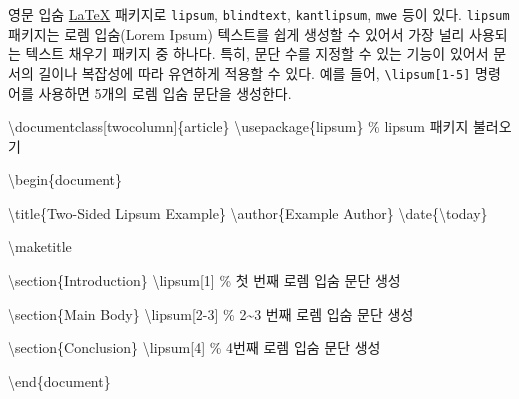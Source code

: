 \documentclass[
  letterpaper,
]{book}
\newenvironment{Shaded}{\begin{snugshade}}{\end{snugshade}}
\newcommand{\BuiltInTok}[1]{\textcolor[rgb]{0.00,0.23,0.31}{#1}}
\newcommand{\CommentTok}[1]{\textcolor[rgb]{0.37,0.37,0.37}{#1}}
\newcommand{\ExtensionTok}[1]{\textcolor[rgb]{0.00,0.23,0.31}{#1}}
\newcommand{\FunctionTok}[1]{\textcolor[rgb]{0.28,0.35,0.67}{#1}}
\newcommand{\KeywordTok}[1]{\textcolor[rgb]{0.00,0.23,0.31}{#1}}
\newcommand{\NormalTok}[1]{\textcolor[rgb]{0.00,0.23,0.31}{#1}}
\begin{document}
영문 입숨 \href{http://example.org}{\LaTeX} 패키지로 \texttt{lipsum},
\texttt{blindtext}, \texttt{kantlipsum}, \texttt{mwe} 등이 있다.
\texttt{lipsum} 패키지는 로렘 입숨(Lorem Ipsum) 텍스트를 쉽게 생성할 수
있어서 가장 널리 사용되는 텍스트 채우기 패키지 중 하나다. 특히, 문단
수를 지정할 수 있는 기능이 있어서 문서의 길이나 복잡성에 따라 유연하게
적용할 수 있다. 예를 들어, \texttt{\textbackslash{}lipsum{[}1-5{]}}
명령어를 사용하면 5개의 로렘 입숨 문단을 생성한다.

\begin{Shaded}
\begin{Highlighting}[]
\BuiltInTok{\textbackslash{}documentclass}\NormalTok{[twocolumn]\{}\ExtensionTok{article}\NormalTok{\}}
\BuiltInTok{\textbackslash{}usepackage}\NormalTok{\{}\ExtensionTok{lipsum}\NormalTok{\} }\CommentTok{\% lipsum 패키지 불러오기}

\KeywordTok{\textbackslash{}begin}\NormalTok{\{}\ExtensionTok{document}\NormalTok{\}}

\FunctionTok{\textbackslash{}title}\NormalTok{\{Two{-}Sided Lipsum Example\}}
\FunctionTok{\textbackslash{}author}\NormalTok{\{Example Author\}}
\FunctionTok{\textbackslash{}date}\NormalTok{\{}\FunctionTok{\textbackslash{}today}\NormalTok{\}}

\FunctionTok{\textbackslash{}maketitle}

\KeywordTok{\textbackslash{}section}\NormalTok{\{Introduction\}}
\FunctionTok{\textbackslash{}lipsum}\NormalTok{[1] }\CommentTok{\% 첫 번째 로렘 입숨 문단 생성}

\KeywordTok{\textbackslash{}section}\NormalTok{\{Main Body\}}
\FunctionTok{\textbackslash{}lipsum}\NormalTok{[2{-}3] }\CommentTok{\% 2\textasciitilde{}3 번째 로렘 입숨 문단 생성}

\KeywordTok{\textbackslash{}section}\NormalTok{\{Conclusion\}}
\FunctionTok{\textbackslash{}lipsum}\NormalTok{[4] }\CommentTok{\% 4번째 로렘 입숨 문단 생성}

\KeywordTok{\textbackslash{}end}\NormalTok{\{}\ExtensionTok{document}\NormalTok{\}}
\end{Highlighting}
\end{Shaded}
\end{document}
